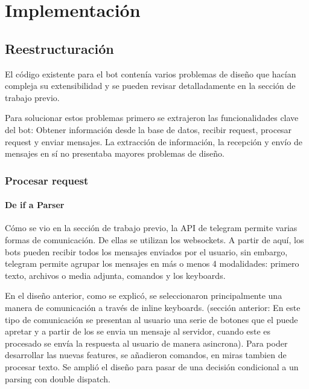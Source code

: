\chapter{Implementación}

\section{Reestructuración}

    El código existente para el bot contenía varios problemas de diseño que hacían compleja su extensibilidad y se pueden revisar detalladamente en la sección de trabajo previo.

    \par Para solucionar estos problemas primero se extrajeron las funcionalidades clave del bot: Obtener información desde la base de datos, recibir request, procesar request y enviar mensajes. La extracción de información, la recepción y envío de mensajes en sí no presentaba mayores problemas de diseño. 

    \subsection{Procesar request}

    \subsubsection{De if a Parser}
    
        \par Cómo se vio en la sección de trabajo previo, la API de telegram permite varias formas de comunicación. De ellas se utilizan los websockets. A partir de aquí, los bots pueden recibir todos los mensajes enviados por el usuario, sin embargo, telegram permite agrupar los mensajes en más o menos 4 modalidades: primero texto, archivos o media adjunta, comandos y los keyboards.

        \par En el diseño anterior, como se explicó, se seleccionaron principalmente una manera de comunicación  a través de inline keyboards. (sección anterior: En este tipo de comunicación se presentan al usuario una serie de botones que el puede apretar y a partir de los se envia un mensaje al servidor, cuando este es procesado se envía la respuesta al usuario de manera asincrona). Para poder desarrollar las nuevas features, se añadieron comandos, en miras tambien de procesar texto. Se amplió el diseño para pasar de una decisión condicional a un parsing con double dispatch.


